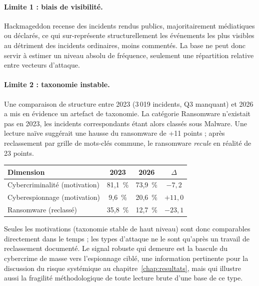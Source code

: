 \paragraph{Limite 1 : biais de visibilité.} Hackmageddon recense des
incidents rendus publics, majoritairement médiatiques ou déclarés, ce qui
sur-représente structurellement les événements les plus visibles au détriment
des incidents ordinaires, moins commentés. La base ne peut donc servir à
estimer un niveau absolu de fréquence, seulement une répartition relative
entre vecteurs d'attaque.

\paragraph{Limite 2 : taxonomie instable.} Une comparaison de structure entre
2023 (3\,019 incidents, Q3 manquant) et 2026 a mis en évidence un artefact de
taxonomie. La catégorie \og Ransomware\fg{} n'existait pas en 2023, les incidents
correspondants étant alors classés sous \og Malware\fg{}. Une lecture naïve
suggérait une hausse du ransomware de +11 points ; après reclassement par
grille de mots-clés commune, le ransomware \emph{recule} en réalité de
23 points.

\begin{center}
\renewcommand{\arraystretch}{1.3}
\begin{tabular}{>{\raggedright}p{4.5cm} c c c}
\toprule
\rowcolor{lightblue}
\textbf{Dimension} & \textbf{2023} & \textbf{2026} & \textbf{$\Delta$} \\
\midrule
Cybercriminalité (motivation) & 81{,}1~\% & 73{,}9~\% & $-7{,}2$ \\
Cyberespionnage (motivation) & 9{,}6~\% & 20{,}6~\% & $+11{,}0$ \\
Ransomware (reclassé) & 35{,}8~\% & 12{,}7~\% & $-23{,}1$ \\
\bottomrule
\end{tabular}
\end{center}

Seules les motivations (taxonomie stable de haut niveau) sont donc
comparables directement dans le temps ; les types d'attaque ne le
sont qu'après un travail de reclassement documenté. Le signal robuste qui
demeure est la bascule du cybercrime de masse vers l'espionnage ciblé, une
information pertinente pour la discussion du risque systémique au chapitre~\ref{chap:resultats},
mais qui illustre aussi la fragilité méthodologique de toute lecture brute
d'une base de ce type.


